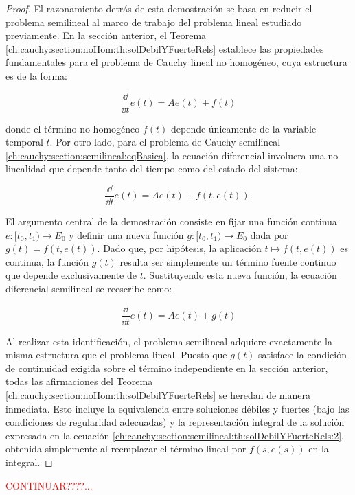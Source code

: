 \begin{proof}
    El razonamiento detrás de esta demostración se basa en reducir el problema semilineal al marco de trabajo del problema lineal estudiado previamente. En la sección anterior, el Teorema \ref{ch:cauchy:section:noHom:th:solDebilYFuerteRels} establece las propiedades fundamentales para el problema de Cauchy lineal no homogéneo, cuya estructura es de la forma:
    
    \[\frac{\dd}{\dd t}e(t) = Ae(t) + f(t)\]
    
    donde el término no homogéneo $f(t)$ depende únicamente de la variable temporal $t$. Por otro lado, para el problema de Cauchy semilineal \eqref{ch:cauchy:section:semilineal:eqBasica}, la ecuación diferencial involucra una no linealidad que depende tanto del tiempo como del estado del sistema:
    
    \[\frac{\dd}{\dd t}e(t) = Ae(t) + f(t, e(t)).\]
    
    El argumento central de la demostración consiste en fijar una función continua $e: [t_0, t_1) \to E_0$ y definir una nueva función $g: [t_0, t_1) \to E_0$ dada por $g(t) = f(t, e(t))$. Dado que, por hipótesis, la aplicación $t \mapsto f(t, e(t))$ es continua, la función $g(t)$ resulta ser simplemente un término fuente continuo que depende exclusivamente de $t$. Sustituyendo esta nueva función, la ecuación diferencial semilineal se reescribe como:
    
    \[\frac{\dd}{\dd t}e(t) = Ae(t) + g(t)\]
    
    Al realizar esta identificación, el problema semilineal adquiere exactamente la misma estructura que el problema lineal. Puesto que $g(t)$ satisface la condición de continuidad exigida sobre el término independiente en la sección anterior, todas las afirmaciones del Teorema \ref{ch:cauchy:section:noHom:th:solDebilYFuerteRels} se heredan de manera inmediata. Esto incluye la equivalencia entre soluciones débiles y fuertes (bajo las condiciones de regularidad adecuadas) y la representación integral de la solución expresada en la ecuación \eqref{ch:cauchy:section:semilineal:th:solDebilYFuerteRels:2}, obtenida simplemente al reemplazar el término lineal por $f(s, e(s))$ en la integral.
\end{proof}

\textcolor{red}{CONTINUAR????...}